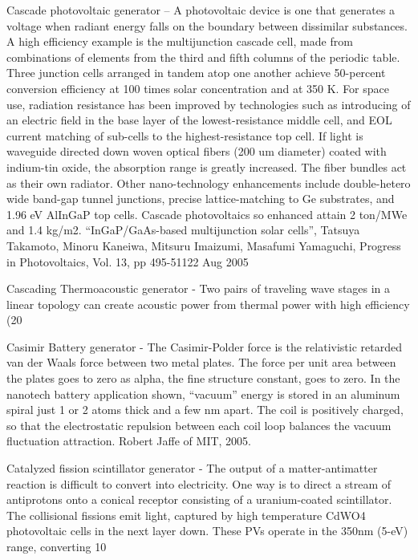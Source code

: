 \documentclass[a4paper]{book}
\begin{document}
Cascade photovoltaic generator – A photovoltaic device is one that generates a voltage when radiant energy falls on the boundary between dissimilar substances.  A high efficiency example is the multijunction cascade cell, made from combinations of elements from the third and fifth columns of the periodic table. Three junction cells arranged in tandem atop one another achieve 50-percent conversion efficiency at 100 times solar concentration and at 350 K. For space use, radiation resistance has been improved by technologies such as introducing of an electric field in the base layer of the lowest-resistance middle cell, and EOL current matching of sub-cells to the highest-resistance top cell. If light is waveguide directed down woven optical fibers (200 um diameter) coated with indium-tin oxide, the absorption range is greatly increased. The fiber bundles act as their own radiator. Other nano-technology enhancements include double-hetero wide band-gap tunnel junctions, precise lattice-matching to Ge substrates, and 1.96 eV AlInGaP top cells. Cascade photovoltaics so enhanced attain 2 ton/MWe and 1.4 kg/m2.  “InGaP/GaAs-based multijunction solar cells”, Tatsuya Takamoto, Minoru Kaneiwa, Mitsuru Imaizumi, Masafumi Yamaguchi,  Progress in Photovoltaics, Vol. 13, pp 495-51122 Aug 2005

Cascading Thermoacoustic generator - Two pairs of traveling wave stages in a linear topology can create acoustic power from thermal power with high efficiency (20%

Casimir Battery generator - The Casimir-Polder force is the relativistic retarded van der Waals force between two metal plates.  The force per unit area between the plates goes to zero as alpha, the fine structure constant, goes to zero. In the nanotech battery application shown, “vacuum” energy is stored in an aluminum spiral just 1 or 2 atoms thick and a few nm apart. The coil is positively charged, so that the electrostatic repulsion between each coil loop balances the vacuum fluctuation attraction.  Robert Jaffe of MIT, 2005.

Catalyzed fission scintillator generator - The output of a matter-antimatter reaction is difficult to convert into electricity. One way is to direct a stream of antiprotons onto a conical receptor consisting of a uranium-coated scintillator. The collisional fissions emit light, captured by high temperature CdWO4 photovoltaic cells in the next layer down. These PVs operate in the 350nm (5-eV) range, converting 10%
 
\end{document}
